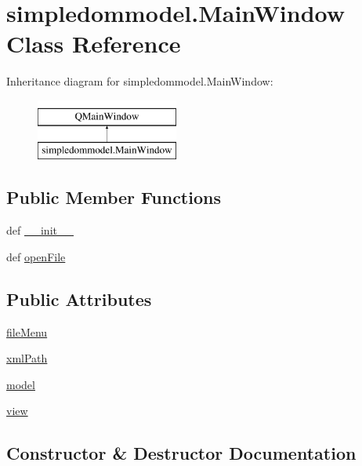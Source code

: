 \hypertarget{classsimpledommodel_1_1MainWindow}{}\section{simpledommodel.\+Main\+Window Class Reference}
\label{classsimpledommodel_1_1MainWindow}
Inheritance diagram for simpledommodel.\+Main\+Window\+:\begin{figure}[H]
\begin{center}
\leavevmode
\includegraphics[height=2.000000cm]{classsimpledommodel_1_1MainWindow}
\end{center}
\end{figure}
\subsection*{Public Member Functions}
\begin{DoxyCompactItemize}
\item 
def \hyperlink{classsimpledommodel_1_1MainWindow_accf68d32f23229c02260bcdc7ad5ac89}{\+\_\+\+\_\+init\+\_\+\+\_\+}
\item 
def \hyperlink{classsimpledommodel_1_1MainWindow_a4e280da48e2265efdd0bfb123b5cd9ca}{open\+File}
\end{DoxyCompactItemize}
\subsection*{Public Attributes}
\begin{DoxyCompactItemize}
\item 
\hyperlink{classsimpledommodel_1_1MainWindow_ae1081f090e8717b74a217439af799c00}{file\+Menu}
\item 
\hyperlink{classsimpledommodel_1_1MainWindow_a733bcff053228ef88a35184c071ed90c}{xml\+Path}
\item 
\hyperlink{classsimpledommodel_1_1MainWindow_a77c369faa7adce6542b9f7a6b62d3f52}{model}
\item 
\hyperlink{classsimpledommodel_1_1MainWindow_abad25c90bec051006f2ebfde03c830c1}{view}
\end{DoxyCompactItemize}


\subsection{Constructor \& Destructor Documentation}
\hypertarget{classsimpledommodel_1_1MainWindow_accf68d32f23229c02260bcdc7ad5ac89}{}
